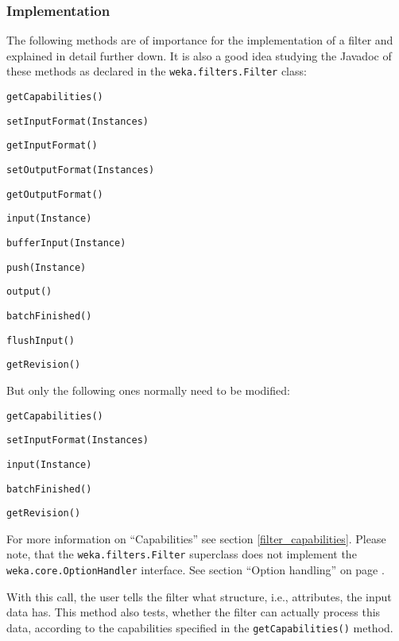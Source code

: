 \subsubsection{Implementation}
The following methods are of importance for the implementation of a filter and
explained in detail further down. It is also a good idea studying the Javadoc
of these methods as declared in the \texttt{weka.filters.Filter} class:
\begin{tight_itemize}
  \item \texttt{getCapabilities()}
  \item \texttt{setInputFormat(Instances)}
  \item \texttt{getInputFormat()}
  \item \texttt{setOutputFormat(Instances)}
  \item \texttt{getOutputFormat()}
  \item \texttt{input(Instance)}
  \item \texttt{bufferInput(Instance)}
  \item \texttt{push(Instance)}
  \item \texttt{output()}
  \item \texttt{batchFinished()}
  \item \texttt{flushInput()}
  \item \texttt{getRevision()}
\end{tight_itemize}
But only the following ones normally need to be modified:
\begin{tight_itemize}
  \item \texttt{getCapabilities()}
  \item \texttt{setInputFormat(Instances)}
  \item \texttt{input(Instance)}
  \item \texttt{batchFinished()}
  \item \texttt{getRevision()}
\end{tight_itemize}
For more information on ``Capabilities'' see section \ref{filter_capabilities}.
Please note, that the \texttt{weka.filters.Filter} superclass does not
implement the \texttt{weka.core.OptionHandler} interface. See section ``Option
handling'' on page \pageref{filter_optionhandling}.

\newpage
{}
With this call, the user tells the filter what structure, i.e., attributes, the
input data has. This method also tests, whether the filter can actually process
this data, according to the capabilities specified in the
\texttt{getCapabilities()} method.

